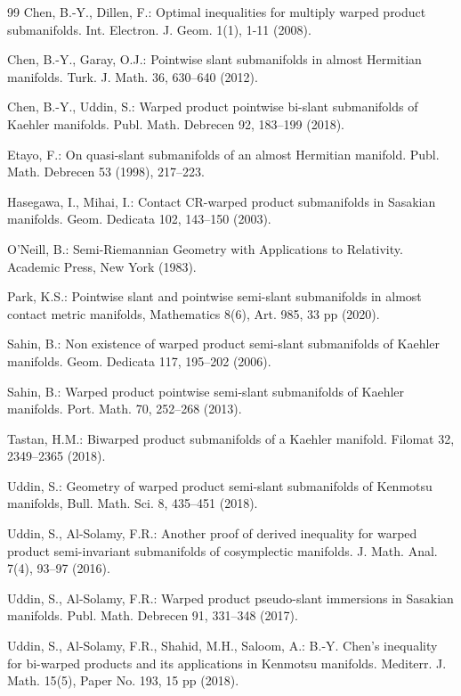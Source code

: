 \documentclass[reqno]{amsart}
\theoremstyle{plain}
\theoremstyle{remark}
\numberwithin{equation}{section}
\begin{document}
\begin{thebibliography}{99}
 Chen, B.-Y.,  Dillen, F.: {Optimal inequalities for multiply warped product submanifolds}. Int. Electron. J. Geom. {1}(1), 1-11 (2008).

 Chen, B.-Y.,  Garay, O.J.: {Pointwise slant submanifolds in almost Hermitian manifolds.} Turk. J. Math. {36}, 630--640 (2012).

 Chen, B.-Y.,  Uddin, S.: {Warped product pointwise bi-slant submanifolds of Kaehler manifolds}. Publ. Math. Debrecen {92}, 183--199 (2018).

  Etayo, F.: {On quasi-slant submanifolds of an almost Hermitian manifold.} Publ. Math. Debrecen {53} (1998), 217--223.

  Hasegawa, I.,  Mihai, I.: {Contact CR-warped product submanifolds in Sasakian manifolds}. Geom. Dedicata  {102}, 143--150  (2003).

 O'Neill, B.: Semi-Riemannian Geometry with Applications to Relativity.  Academic Press, New York (1983).

  Park, K.S.: {Pointwise slant and pointwise semi-slant submanifolds in almost contact metric manifolds}, Mathematics  8(6), Art. 985, 33 pp (2020).

  Sahin, B.:  Non existence of warped product semi-slant submanifolds of Kaehler manifolds. Geom. Dedicata {117}, 195--202 (2006).

 Sahin, B.: {Warped product pointwise semi-slant submanifolds of Kaehler manifolds}. Port. Math. {70}, 252--268 (2013).

  Tastan, H.M.: {Biwarped product submanifolds of a Kaehler manifold}. Filomat  {32}, 2349--2365  (2018).

 Uddin, S.: {Geometry of warped product semi-slant submanifolds of Kenmotsu manifolds}, Bull. Math. Sci. {8},  435--451 (2018).

 Uddin, S., Al-Solamy, F.R.: Another proof of derived inequality for warped product semi-invariant submanifolds of cosymplectic manifolds. J. Math. Anal. 7(4), 93--97 (2016).

 Uddin, S.,  Al-Solamy, F.R.: {Warped product pseudo-slant immersions in Sasakian manifolds}. Publ. Math. Debrecen {91}, 331--348 (2017).

  Uddin, S.,  Al-Solamy, F.R.,  Shahid, M.H.,  Saloom, A.: {B.-Y. Chen's inequality for bi-warped products and its applications in Kenmotsu manifolds}. Mediterr. J. Math. {15}(5), Paper No. 193, 15 pp (2018).


\end{thebibliography}
\end{document}

